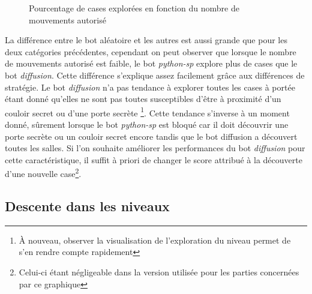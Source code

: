 \documentclass[a4paper,12pt]{article}
\begin{document}
\begin{figure}[H]
  \caption{\label{fig:squares_explored} Pourcentage de cases explorées en
    fonction du nombre de mouvements autorisé}
\end{figure}

La différence entre le bot aléatoire et les autres est aussi grande que pour les
deux catégories précédentes, cependant on peut observer que lorsque le nombre de
mouvements autorisé est faible, le bot {\em python-sp} explore plus de cases que
le bot {\em diffusion}. Cette différence s'explique assez facilement grâce aux
différences de stratégie. Le bot {\em diffusion} n'a pas tendance à explorer
toutes les cases à portée étant donné qu'elles ne sont pas toutes susceptibles
d'être à proximité d'un couloir secret ou d'une porte secrète \footnote{À
  nouveau, observer la visualisation de l'exploration du niveau permet de s'en
  rendre compte rapidement}. Cette tendance s'inverse à un moment donné,
sûrement lorsque le bot {\em python-sp} est bloqué car il doit découvrir une
porte secrète ou un couloir secret encore tandis que le bot diffusion a
découvert toutes les salles. Si l'on souhaite améliorer les performances du bot
{\em diffusion} pour cette caractéristique, il suffit à priori de changer le
score attribué à la découverte d'une nouvelle case\footnote{Celui-ci étant
négligeable dans la version utilisée pour les parties concernées par ce
graphique}.

\subsection{Descente dans les niveaux}
\end{document}
